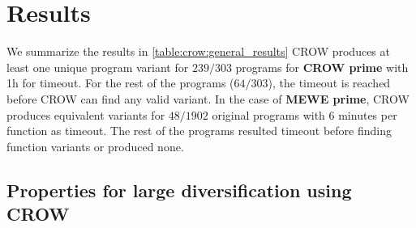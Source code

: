 






\section{Results}

We summarize the results in \autoref{table:crow:general_results}
CROW produces at least one unique program variant for $239/303{}$ programs for \textbf{CROW prime} with 1h for timeout. For the rest of the programs ($64/303{}$), the timeout is reached before CROW can find any valid variant. 
In the case of \textbf{MEWE prime}, CROW produces equivalent variants for $48/1902$ original programs with 6 minutes per function as timeout. The rest of the programs resulted timeout before finding function variants or produced none.




\subsection{Properties for large diversification using CROW}

